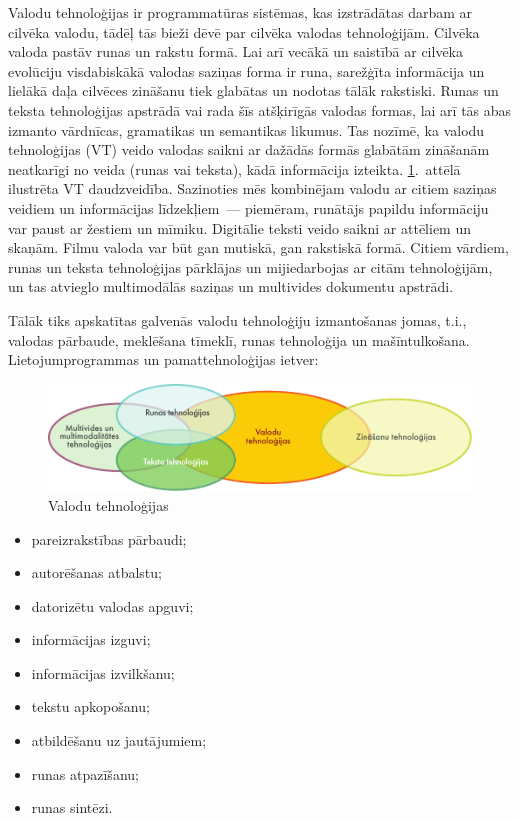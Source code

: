 \begin{multicols}{2}

  Valodu tehnoloģijas ir programmatūras sistēmas, kas izstrādātas darbam ar cilvēka valodu, tādēļ tās bieži dēvē par cilvēka valodas tehnoloģijām.  Cilvēka valoda pastāv runas un rakstu formā.  Lai arī vecākā un saistībā ar cilvēka evolūciju visdabiskākā valodas saziņas forma ir runa, sarežģīta informācija un lielākā daļa cilvēces zināšanu tiek glabātas un nodotas tālāk rakstiski.  Runas un teksta tehnoloģijas apstrādā vai rada šīs atšķirīgās valodas formas, lai arī tās abas izmanto vārdnīcas, gramatikas un semantikas likumus.  Tas nozīmē, ka valodu tehnoloģijas (VT) veido valodas saikni ar dažādās formās glabātām zināšanām neatkarīgi no veida (runas vai teksta), kādā informācija izteikta.  \ref{fig:ltincontext_de}.~attēlā ilustrēta VT daudzveidība.  Sazinoties mēs kombinējam valodu ar citiem saziņas veidiem un informācijas līdzekļiem~--- piemēram, runātājs papildu informāciju var paust ar žestiem un mīmiku.  Digitālie teksti veido saikni ar attēliem un skaņām.  Filmu valoda var būt gan mutiskā, gan rakstiskā formā.  Citiem vārdiem, runas un teksta tehnoloģijas pārklājas un mijiedarbojas ar citām tehnoloģijām, un tas atvieglo multimodālās saziņas un multivides dokumentu apstrādi.

  Tālāk tiks apskatītas galvenās valodu tehnoloģiju izmantošanas jomas, t.i., valodas pārbaude, meklēšana tīmeklī, runas tehnoloģija un mašīntulkošana.  Lietojumprogrammas un pamattehnoloģijas ietver:

\begin{figure}[htb]
  \center
  \includegraphics[width=\textwidth]{../_media/latvian/language_technologies}
  \caption{Valodu tehnoloģijas}
  \label{fig:ltincontext_de}
\end{figure}

\begin{itemize}
\item  pareizrakstības pārbaudi;
\item  autorēšanas atbalstu;
\item  datorizētu valodas apguvi;
\item  informācijas izguvi; 
\item  informācijas izvilkšanu;
\item  tekstu apkopošanu;
\item  atbildēšanu uz jautājumiem;
\item  runas atpazīšanu; 
\item  runas sintēzi. 
\end{itemize}


\end{multicols}
